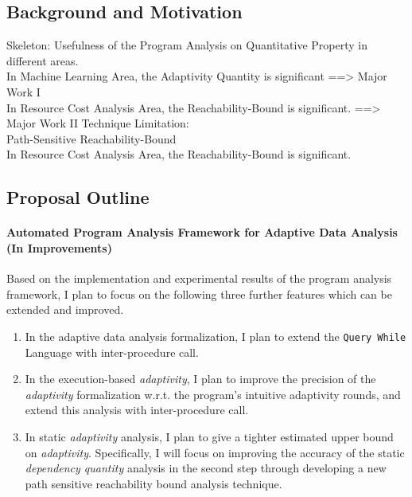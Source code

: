 \subsection{Background and Motivation}
 \label{sec:intro-background}
 Skeleton:
Usefulness of the Program Analysis on Quantitative Property in different areas.
\\
In Machine Learning Area, the Adaptivity Quantity is significant
==> Major Work I
\\
In Resource Cost Analysis Area, the Reachability-Bound is significant.
==> Major Work II
Technique Limitation:
\\
Path-Sensitive Reachability-Bound 
\\
In Resource Cost Analysis Area, the Reachability-Bound is significant.


\subsection{Proposal Outline}
\label{sec:intro-outline}
\paragraph{Automated Program Analysis Framework for Adaptive Data Analysis (In Improvements)}
\label{sec:intro-adapt}
Based on the implementation and experimental results of the program analysis framework,
I plan to focus on the following three further features which can be extended and improved.
\begin{enumerate}
    \item In the adaptive data analysis formalization, I plan to extend the {\tt Query While} Language with inter-procedure call.
    \item In the execution-based \emph{adaptivity},
    I plan to improve the precision of the \emph{adaptivity} formalization w.r.t. the program's intuitive adaptivity rounds,
and extend this analysis with inter-procedure call.
\item In static \emph{adaptivity} analysis, I plan to give a tighter estimated upper bound on \emph{adaptivity}.
Specifically, I will focus on improving the accuracy of the static \emph{dependency quantity} analysis in the second step through 
developing a new path sensitive reachability bound analysis technique. 
\end{enumerate}
